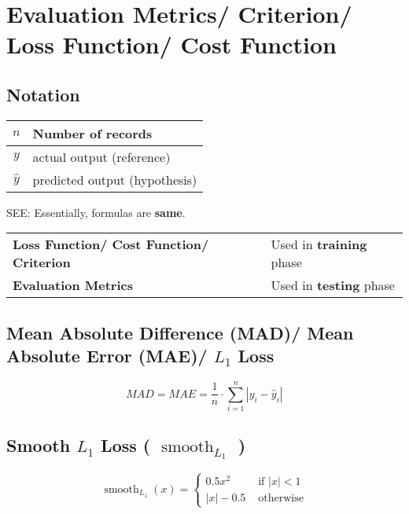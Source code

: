 \chapter{Evaluation Metrics/ Criterion/ Loss Function/ Cost Function}

\section*{Notation}
\begin{table}[h]
    \begin{tabular}{|c|l|}
        \hline
        
       $n$  & Number of records \\ 
       \hline
       
       $y$ & actual output (reference) \\ 
       \hline
       
       $\hat{y}$ & predicted output (hypothesis) \\ 
       \hline 
       
    \end{tabular}
\end{table}

SEE: 
Essentially, formulas are \textbf{same}.

\begin{table}[h]
    \begin{tabular}{l l}
        \textbf{Loss Function/ Cost Function/ Criterion} & Used in \textbf{training} phase \\
        
        \textbf{Evaluation Metrics} & Used in \textbf{testing} phase \\
    \end{tabular}
\end{table}


\section{Mean Absolute Difference (MAD)/ Mean Absolute Error (MAE)/ $L_1$ Loss}\label{Mean Absolute Difference (MAD)}\label{Mean Absolute Error (MAE)}\label{L1 Loss}

\[
    MAD = MAE = \displaystyle\dfrac{1}{n} \cdot \sum_{i=1}^{n} \left| y_i - \hat{y}_i \right|
\]

\section{Smooth $L_1$ Loss ( $\operatorname{smooth}_{L_1}$ )}
\[
    \displaystyle
    \operatorname{smooth}_{L_1}(x) = \begin{cases}
        0.5x^2 & \text{ if } |x| < 1 \\
        |x| - 0.5 & \text{ otherwise}
    \end{cases}
\]



